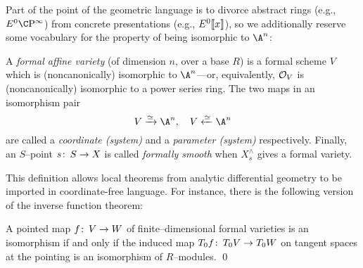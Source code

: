 Part of the point of the geometric language is to divorce abstract rings (e.g., \(E^0 \CP^\infty\)) from concrete presentations (e.g., \(E^0\llbracket{x}\rrbracket\)), so we additionally reserve some vocabulary for the property of being isomorphic to \(\A^n\):
\begin{definition}\label{DefnFormalVariety}
A \textit{formal affine variety} (of dimension \(n\), over a base \(R\)) is a formal scheme \(V\) which is (noncanonically) isomorphic to \(\A^n\)---or, equivalently, \(\mathcal{O}_V\) is (noncanonically) isomorphic to a power series ring.  The two maps in an isomorphism pair \[V \xrightarrow{\simeq} \A^n, \quad V \xleftarrow{\simeq} \A^n\] are called a \textit{coordinate (system)} and a \textit{parameter (system)} respectively.  Finally, an \(S\)--point \(s\colon\thinspace S \to X\) is called \textit{formally smooth} when \(X^\wedge_s\) gives a formal variety.
\end{definition}

This definition allows local theorems from analytic differential geometry to be imported in coordinate-free language.  For instance, there is the following version of the inverse function theorem:
\begin{theorem}\label{InverseFunctionTheoremForFVars}
A pointed map \(f\colon\thinspace V \to W\) of finite--dimensional formal varieties is an isomorphism if and only if the induced map \(T_0 f\colon\thinspace T_0 V \to T_0 W\) on tangent spaces at the pointing is an isomorphism of \(R\)--modules. \qed
\end{theorem}

